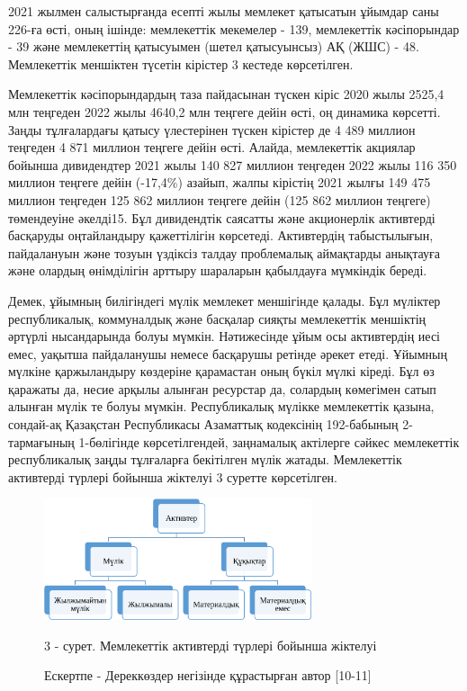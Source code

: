 \begin{multicols}{2}
2021 жылмен салыстырғанда есепті жылы мемлекет қатысатын ұйымдар саны
226-ға өсті, оның ішінде: мемлекеттік мекемелер - 139, мемлекеттік
кәсіпорындар - 39 және мемлекеттің қатысуымен (шетел қатысуынсыз) АҚ
(ЖШС) - 48. Мемлекеттік меншіктен түсетін кірістер 3 кестеде
көрсетілген.

Мемлекеттік кәсіпорындардың таза пайдасынан түскен кіріс 2020 жылы
2525,4 млн теңгеден 2022 жылы 4640,2 млн теңгеге дейін өсті, оң динамика
көрсетті. Заңды тұлғалардағы қатысу үлестерінен түскен кірістер де 4 489
миллион теңгеден 4 871 миллион теңгеге дейін өсті. Алайда, мемлекеттік
акциялар бойынша дивидендтер 2021 жылы 140 827 миллион теңгеден 2022
жылы 116 350 миллион теңгеге дейін (-17,4\%) азайып, жалпы кірістің 2021
жылғы 149 475 миллион теңгеден 125 862 миллион теңгеге дейін (125 862
миллион теңгеге) төмендеуіне әкелді15. Бұл дивидендтік саясатты және
акционерлік активтерді басқаруды оңтайландыру қажеттілігін көрсетеді.
Активтердің табыстылығын, пайдалануын және тозуын үздіксіз талдау
проблемалық аймақтарды анықтауға және олардың өнімділігін арттыру
шараларын қабылдауға мүмкіндік береді.

Демек, ұйымның билігіндегі мүлік мемлекет меншігінде қалады. Бұл
мүліктер республикалық, коммуналдық және басқалар сияқты мемлекеттік
меншіктің әртүрлі нысандарында болуы мүмкін. Нәтижесінде ұйым осы
активтердің иесі емес, уақытша пайдаланушы немесе басқарушы ретінде
әрекет етеді. Ұйымның мүлкіне қаржыландыру көздеріне қарамастан оның
бүкіл мүлкі кіреді. Бұл өз қаражаты да, несие арқылы алынған ресурстар
да, солардың көмегімен сатып алынған мүлік те болуы мүмкін.
Республикалық мүлікке мемлекеттік қазына, сондай-ақ Қазақстан
Республикасы Азаматтық кодексінің 192-бабының 2-тармағының 1-бөлігінде
көрсетілгендей, заңнамалық актілерге сәйкес мемлекеттік республикалық
заңды тұлғаларға бекітілген мүлік жатады. Мемлекеттік активтерді түрлері
бойынша жіктелуі 3 суретте көрсетілген.
\end{multicols}

\begin{figure}[H]
	\centering
	\includegraphics[width=0.7\textwidth]{media/ekon2/image11}
	\caption*{3 - сурет. Мемлекеттік активтерді түрлері бойынша жіктелуі}
	\caption*{Ескертпе - Дереккөздер негізінде құрастырған автор {[}10-11{]}}
\end{figure}

